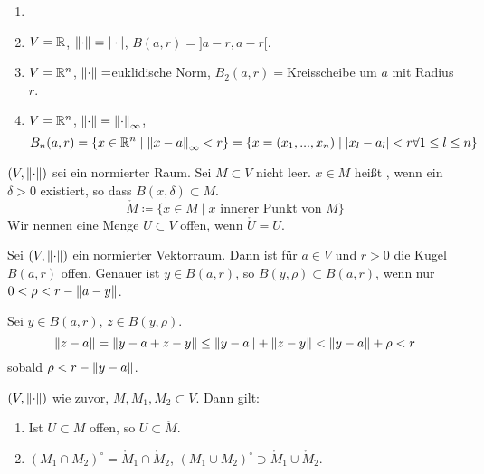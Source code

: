 \begin{beispiel*}
	\begin{enumerate}
		\item[]
		\item $ V=\mathbb{R} $, $ \left\|\cdot\right\|=|\cdot| $, $ B(a,r)=]a-r,a-r[ $.
		\item $ V=\mathbb{R}^n $, $ \left\|\cdot\right\|= $euklidische Norm, $ B_2(a,r)= $Kreisscheibe um $ a $ mit Radius $ r $.
		\item $ V=\mathbb{R}^n $, $ \left\|\cdot\right\|=\left\|\cdot\right\|_\infty $, \[ B_n(a,r)=\lbrace x\in\mathbb{R}^n\mid \left\|x-a\right\|_\infty<r\rbrace=\lbrace x=(x_1,...,x_n)\mid |x_l-a_l|<r\forall 1\leq l\leq n\rbrace \]
	\end{enumerate}
\end{beispiel*}
\begin{definition}
	$ (V,\left\|\cdot\right\|) $ sei ein normierter Raum. Sei $ M\subset V $ nicht leer. $ x\in M $ hei\ss t , wenn ein $ \delta>0 $ existiert, so dass $ B(x,\delta)\subset M $.
	\[ \mathring{M}\coloneqq\lbrace x\in M\mid x\text{ innerer Punkt von }M\rbrace \]
	Wir nennen eine Menge $ U\subset V $ offen, wenn $ \mathring{U}=U $.
\end{definition}
\begin{lemma}
	Sei $ (V,\left\|\cdot\right\|) $ ein normierter Vektorraum. Dann ist f\"ur $ a\in V $ und $ r>0 $ die Kugel $ B(a,r) $ offen. Genauer ist $ y\in B(a,r) $, so $ B(y,\rho)\subset B(a,r) $, wenn nur $ 0<\rho<r-\left\|a-y\right\| $.
\end{lemma}
\begin{beweis}
	Sei $ y\in B(a,r) $, $ z\in B(y,\rho) $.
	\[ \left\|z-a\right\|=\left\|y-a+z-y\right\|\leq\left\|y-a\right\|+\left\|z-y\right\|<\left\|y-a\right\|+\rho<r \]
	sobald $ \rho<r-\left\|y-a\right\| $.
\end{beweis}
\begin{lemma}
	$ (V,\left\|\cdot\right\|) $ wie zuvor, $ M, M_1,M_2\subset V $. Dann gilt:
	\begin{enumerate}
		\item Ist $ U\subset M $ offen, so $ U\subset\mathring M $.
		\item $ (M_1\cap M_2)^\circ=\mathring{M}_1\cap \mathring{M}_2 $, $ (M_1\cup M_2)^\circ\supset \mathring{M}_1\cup\mathring{M}_2 $. 
	\end{enumerate}
\end{lemma}
